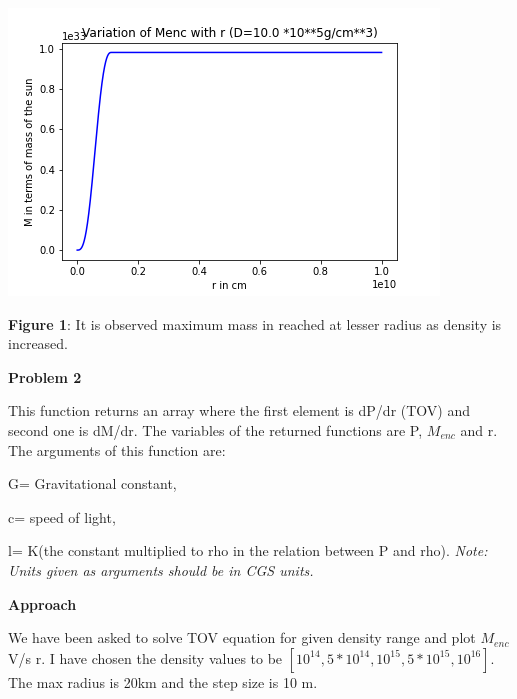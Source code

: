 \documentclass{article}
\begin{document}
\begin{center}
\begin{multicols}{2}
\begin{center}
        \end{center}
\columnbreak
       \includegraphics[scale=0.3]{Images/Mr_pb1_4}
\end{multicols}
\textbf{Figure 1}: It is observed maximum mass in reached at lesser radius as density is increased.
\end{center}
\vspace{0.2em}

\clearpage
\vspace{1.5em}
\textbf{Problem 2}\vspace{1.5em}

This function returns an array where the first element is dP/dr (TOV) and second one is dM/dr. The variables of the returned functions are P, $M_{enc}$ and r.
    The arguments of this function are:
      \vspace{0.2em}
      
        G= Gravitational constant,
          \vspace{0.2em}
          
        c= speed of light,
          \vspace{0.2em}
          
        l= K(the constant multiplied to rho in the relation between P and rho).
          \vspace{0.2em}
        \emph{Note: Units given as arguments should be in CGS units.}
  
  \vspace{0.2em}
  
 \textbf{Approach}
 
 We have been asked to solve TOV equation for given density range and plot $M_{enc}$ V/s r. I have chosen the density values to be $[10^{14}, 5*10^{14}, 10^{15}, 5*10^{15},10^{16}]$. The max radius is 20km and the step size is 10 m. 
 
\end{document}
